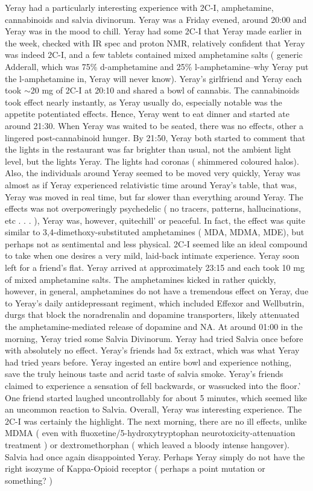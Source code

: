 \documentclass[12pt]{book}
\begin{document}
Yeray had a particularly interesting experience with 2C-I, amphetamine, cannabinoids and salvia divinorum. Yeray was a Friday evened, around 20:00 and Yeray was in the mood to chill. Yeray had some 2C-I that Yeray made earlier in the week, checked with IR spec and proton NMR, relatively confident that Yeray was indeed 2C-I, and a few tablets contained mixed amphetamine salts ( generic Adderall, which was 75\% d-amphetamine and 25\% l-amphetamine--why Yeray put the l-amphetamine in, Yeray will never know). Yeray's girlfriend and Yeray each took $\sim$20 mg of 2C-I at 20:10 and shared a bowl of cannabis. The cannabinoids took effect nearly instantly, as Yeray usually do, especially notable was the appetite potentiated effects. Hence, Yeray went to eat dinner and started ate around 21:30. When Yeray was waited to be seated, there was no effects, other a lingered post-cannabinoid hunger. By 21:50, Yeray both started to comment that the lights in the restaurant was far brighter than usual, not the ambient light level, but the lights Yeray. The lights had coronas ( shimmered coloured halos). Also, the individuals around Yeray seemed to be moved very quickly, Yeray was almost as if Yeray experienced relativistic time around Yeray's table, that was, Yeray was moved in real time, but far slower than everything around Yeray. The effects was not overpoweringly psychedelic ( no tracers, patterns, hallucinations, etc . . .  ), Yeray was, however, quitechill' or peaceful. In fact, the effect was quite similar to 3,4-dimethoxy-substituted amphetamines ( MDA, MDMA, MDE), but perhaps not as sentimental and less physical. 2C-I seemed like an ideal compound to take when one desires a very mild, laid-back intimate experience. Yeray soon left for a friend's flat. Yeray arrived at approximately 23:15 and each took 10 mg of mixed amphetamine salts. The amphetamines kicked in rather quickly, however, in general, amphetamines do not have a tremendous effect on Yeray, due to Yeray's daily antidepressant regiment, which included Effexor and Wellbutrin, durgs that block the noradrenalin and dopamine transporters, likely attenuated the amphetamine-mediated release of dopamine and NA. At around 01:00 in the morning, Yeray tried some Salvia Divinorum. Yeray had tried Salvia once before with absolutely no effect. Yeray's friends had 5x extract, which was what Yeray had tried years before. Yeray ingested an entire bowl and experience nothing, save the truly heinous taste and acrid taste of salvia smoke. Yeray's friends claimed to experience a sensation of fell backwards, or wassucked into the floor.' One friend started laughed uncontrollably for about 5 minutes, which seemed like an uncommon reaction to Salvia. Overall, Yeray was interesting experience. The 2C-I was certainly the highlight. The next morning, there are no ill effects, unlike MDMA ( even with fluoxetine/5-hydroxytryptophan neurotoxicity-attenuation treatment ) or dextromethorphan ( which leaved a bloody intense hangover). Salvia had once again disappointed Yeray. Perhaps Yeray simply do not have the right isozyme of Kappa-Opioid receptor ( perhaps a point mutation or something? )
\end{document}
